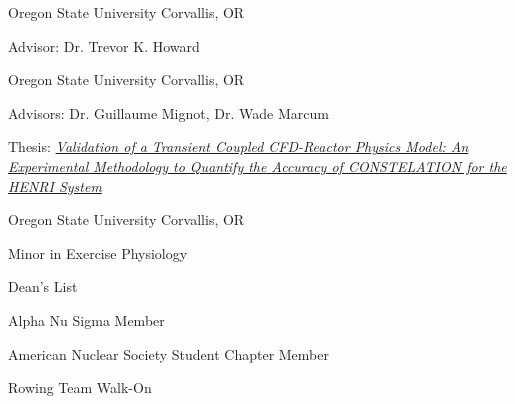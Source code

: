 
\begin{cventries}
  \cventry
    {} %
    {Oregon State University} %
    {Corvallis, OR} %
    {} %
    {
      \begin{cvitems} %
         \item{Advisor: Dr. Trevor K. Howard}
      \end{cvitems}
    }
    
  \cventry
    {} %
    {Oregon State University} %
    {Corvallis, OR} %
    {} %
    {
      \begin{cvitems} %
         \item{Advisors: Dr. Guillaume Mignot, Dr. Wade Marcum}
         \item{Thesis: \href{https://ir.library.oregonstate.edu/concern/graduate_thesis_or_dissertations/qj72ph23p?locale=en}{\textit{Validation of a Transient Coupled CFD-Reactor Physics Model: An Experimental Methodology to Quantify the Accuracy of CONSTELATION for the HENRI System}}}
      \end{cvitems}
    }

  \cventry
    {} %
    {Oregon State University} %
    {Corvallis, OR} %
    {} %
    {
      \begin{cvitems} %
         \item{Minor in Exercise Physiology}
         \vspace{0.5mm}
         \item{Dean's List \textemdash \ }
         \vspace{0.5mm}
         \item {Alpha Nu Sigma Member}
         \vspace{0.5mm}
         \item{American Nuclear Society Student Chapter Member}
         \vspace{0.5mm}
         \item {Rowing Team Walk-On \textemdash \ }
      \end{cvitems}
    }
    

\end{cventries}
